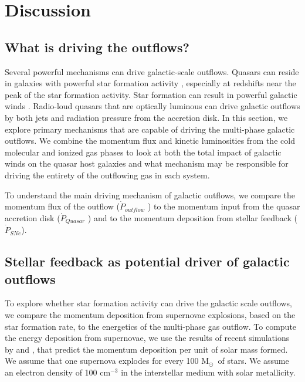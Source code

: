 \documentclass[twocolumn]{aastex63}
\newcommand{\msun}{M$_{\odot}$}
\newcommand{\momfluxagn}{$\dot{P}_{Quasar}$ }
\newcommand{\momfluxout}{$\dot{P}_{outflow}$ }
\newcommand{\eden}{cm$^{-3}$ }
\begin{document}
\section{Discussion}\label{sec:discussion}

\subsection{What is driving the outflows?}\label{sec:driving}
Several powerful mechanisms can drive galactic-scale outflows. Quasars can reside in galaxies with powerful star formation activity \citep{Duras17,Aird19,Circosta21,Bischetti21}, especially at redshifts near the peak of the star formation activity. Star formation can result in powerful galactic winds \citep{Rupke18}. Radio-loud quasars that are optically luminous can drive galactic outflows by both jets \citep{Wagner12,Mukherjee16} and radiation pressure \citep{Murray95,Faucher12a,Zubovas12,Costa18} from the accretion disk. In this section, we explore primary mechanisms that are capable of driving the multi-phase galactic outflows. We combine the momentum flux and kinetic luminosities from the cold molecular and ionized gas phases to look at both the total impact of galactic winds on the quasar host galaxies and what mechanism may be responsible for driving the entirety of the outflowing gas in each system.

To understand the main driving mechanism of galactic outflows, we compare the momentum flux of the outflow (\momfluxout) to the momentum input from the quasar accretion disk (\momfluxagn) and to the momentum deposition from stellar feedback ($\dot{P}_{SNe}$).

\subsection{Stellar feedback as potential driver of galactic outflows}
To explore whether star formation activity can drive the galactic scale outflows, we compare the momentum deposition from supernovae explosions, based on the star formation rate, to the energetics of the multi-phase gas outflow. To compute the energy deposition from supernovae, we use the results of recent simulations by \citet{2015MNRAS.450..504M} and \citet{2015ApJ...802...99K}, that predict the momentum deposition per unit of solar mass formed. We assume that one supernova explodes for every 100 \msun\ of stars. We assume an electron density of 100 \eden in the interstellar medium with solar metallicity.
\end{document}
